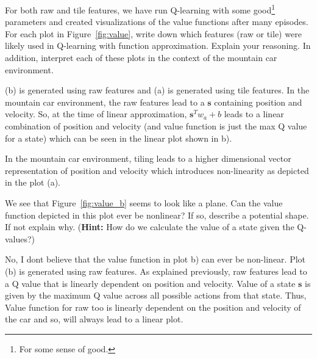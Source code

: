 \documentclass[11pt,addpoints,answers]{exam}
\newcommand{\sv}{\mathbf{s}}
\begin{document}
\begin{questions}
    \question[2] For both raw and tile features, we have run Q-learning with some good\footnote{For some sense of good.} parameters and created visualizations of the value functions after many episodes. For each plot in Figure~\ref{fig:value}, write down which features (raw or tile) were likely used in Q-learning with function approximation. Explain your reasoning. In addition, interpret each of these plots in the context of the mountain car environment.
    
    \begin{your_solution}[title=Answer,height=5cm,width=15cm]
        (b) is generated using raw features and (a) is generated using tile features. In the mountain car environment, the raw features lead to a $\sv$ containing position and velocity. So, at the time of linear approximation, $\sv^Tw_a + b$ leads to a linear combination of position and velocity (and value function is just the max Q value for a state) which can be seen in the linear plot shown in b).
        
        In the mountain car environment, tiling leads to a higher dimensional vector representation of position and velocity which introduces non-linearity as depicted in the plot (a).
    \end{your_solution}

    \question[2] We see that Figure~\ref{fig:value_b} seems to look like a plane. Can the value function depicted in this plot ever be nonlinear? If so, describe a potential shape. If not explain why. (\textbf{Hint:} How do we calculate the value of a state given the Q-values?)

    \begin{your_solution}[title=Answer,height=5cm,width=15cm]
        No, I dont believe that the value function in plot b) can ever be non-linear.
        Plot (b) is generated using raw features. As explained previously, raw features lead to a Q value that is linearly dependent on position and velocity. Value of a state $\sv$ is given by the maximum Q value across all possible actions from that state. Thus, Value function for raw too is linearly dependent on the position and velocity of the car and so, will always lead to a linear plot.
    \end{your_solution}
    
    
        

\end{questions}
\end{document}
